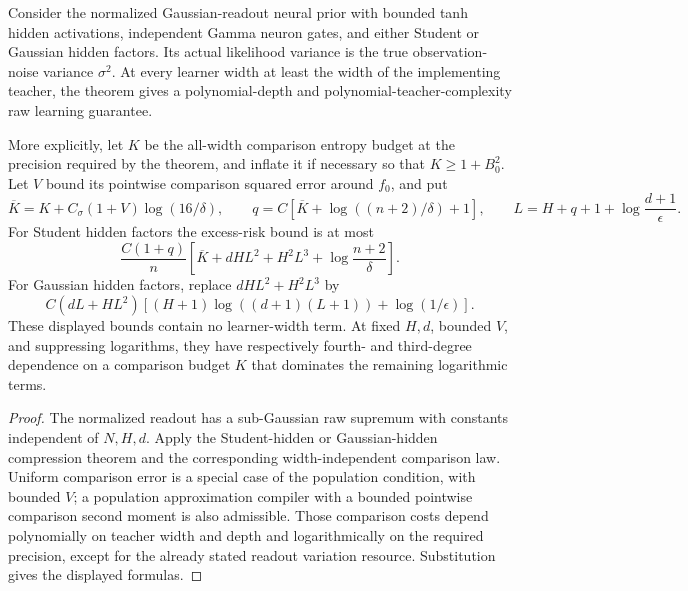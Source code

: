 \begin{corollary}
\label{cor:matched-neural-polynomial}
Consider the normalized Gaussian-readout neural prior with bounded tanh hidden activations, independent Gamma neuron gates, and either Student or Gaussian hidden factors. Its actual likelihood variance is the true observation-noise variance $\sigma^2$. At every learner width at least the width of the implementing teacher, the theorem gives a polynomial-depth and polynomial-teacher-complexity raw learning guarantee.

More explicitly, let $K$ be the all-width comparison entropy budget at the precision required by the theorem, and inflate it if necessary so that $K\ge1+B_0^2$. Let $V$ bound its pointwise comparison squared error around $f_0$, and put
\[
 \overline K=K+C_\sigma(1+V)\log(16/\delta),\qquad
 q=C[\overline K+\log((n+2)/\delta)+1],\qquad
 L=H+q+1+\log\frac{d+1}{\epsilon}.
\]
For Student hidden factors the excess-risk bound is at most
\[
 \frac{C(1+q)}n
   \left[\overline K+dHL^2+H^2L^3+\log\frac{n+2}{\delta}\right].
\]
For Gaussian hidden factors, replace $dHL^2+H^2L^3$ by
\[
 C(dL+HL^2)\left[(H+1)\log((d+1)(L+1))
                                      +\log(1/\epsilon)\right].
\]
These displayed bounds contain no learner-width term. At fixed $H,d$, bounded $V$, and suppressing logarithms, they have respectively fourth- and third-degree dependence on a comparison budget $K$ that dominates the remaining logarithmic terms.
\end{corollary}
\begin{proof}
The normalized readout has a sub-Gaussian raw supremum with constants independent of $N,H,d$. Apply the Student-hidden or Gaussian-hidden compression theorem and the corresponding width-independent comparison law. Uniform comparison error is a special case of the population condition, with bounded $V$; a population approximation compiler with a bounded pointwise comparison second moment is also admissible. Those comparison costs depend polynomially on teacher width and depth and logarithmically on the required precision, except for the already stated readout variation resource. Substitution gives the displayed formulas.
\end{proof}

